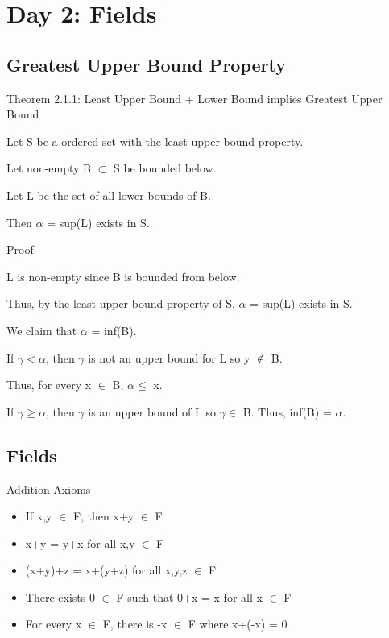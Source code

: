 \newpage
\section[Day 2: Fields]{Day 2: Fields}





\subsection{Greatest Upper Bound Property}

{ \color{red} Theorem 2.1.1: Least Upper Bound + Lower Bound implies Greatest Upper Bound }
	\begin{adjustbox}{minipage=14cm, right}
		Let S be a ordered set with the least upper bound property.

		Let non-empty B $\subset$ S be bounded below.

		Let L be the set of all lower bounds of B.

		Then $\alpha$ = sup(L) exists in S.
	\end{adjustbox}

{ \color{magenta} \underline{Proof} }

	L is non-empty since B is bounded from below.

	Thus, by the least upper bound property of S, $\alpha$ = sup(L) exists in S.

	We claim that $\alpha$ = inf(B).

	If $\gamma < \alpha$, then $\gamma$ is not an upper bound for L so y $\not \in$ B.

	Thus, for every x $\in$ B, $\alpha \leq$ x.

	If $\gamma \geq \alpha$, then $\gamma$ is an upper bound of L so $\gamma \in$ B.
	Thus, inf(B) = $\alpha$.





\subsection{Fields}

Addition Axioms
	\begin{itemize}[leftmargin=1cm]
		\item If x,y $\in$ F, then x+y $\in$ F
	
		\item x+y = y+x for all x,y $\in$ F
	
		\item (x+y)+z = x+(y+z) for all x,y,z $\in$ F
	
		\item There exists 0 $\in$ F such that 0+x = x for all x $\in$ F
	
		\item For every x $\in$ F, there is -x $\in$ F where x+(-x) = 0
	\end{itemize}


